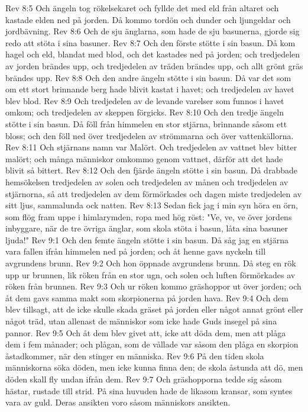 Rev 8:5  Och ängeln tog rökelsekaret och fyllde det med eld från altaret och kastade elden ned på jorden. Då kommo tordön och dunder och ljungeldar och jordbävning.
Rev 8:6  Och de sju änglarna, som hade de sju basunerna, gjorde sig redo att stöta i sina basuner.
Rev 8:7  Och den förste stötte i sin basun. Då kom hagel och eld, blandat med blod, och det kastades ned på jorden; och tredjedelen av jorden brändes upp, och tredjedelen av träden brändes upp, och allt grönt gräs brändes upp.
Rev 8:8  Och den andre ängeln stötte i sin basun. Då var det som om ett stort brinnande berg hade blivit kastat i havet; och tredjedelen av havet blev blod.
Rev 8:9  Och tredjedelen av de levande varelser som funnos i havet omkom; och tredjedelen av skeppen förgicks.
Rev 8:10  Och den tredje ängeln stötte i sin basun. Då föll från himmelen en stor stjärna, brinnande såsom ett bloss; och den föll ned över tredjedelen av strömmarna och över vattenkällorna.
Rev 8:11  Och stjärnans namn var Malört. Och tredjedelen av vattnet blev bitter malört; och många människor omkommo genom vattnet, därför att det hade blivit så bittert.
Rev 8:12  Och den fjärde ängeln stötte i sin basun. Då drabbade hemsökelsen tredjedelen av solen och tredjedelen av månen och tredjedelen av stjärnorna, så att tredjedelen av dem förmörkades och dagen miste tredjedelen av sitt ljus, sammalunda ock natten.
Rev 8:13  Sedan fick jag i min syn höra en örn, som flög fram uppe i himlarymden, ropa med hög röst: "Ve, ve, ve över jordens inbyggare, när de tre övriga änglar, som skola stöta i basun, låta sina basuner ljuda!"
Rev 9:1  Och den femte ängeln stötte i sin basun. Då såg jag en stjärna vara fallen ifrån himmelen ned på jorden; och åt henne gavs nyckeln till avgrundens brunn.
Rev 9:2  Och hon öppnade avgrundens brunn. Då steg en rök upp ur brunnen, lik röken från en stor ugn, och solen och luften förmörkades av röken från brunnen.
Rev 9:3  Och ur röken kommo gräshoppor ut över jorden; och åt dem gavs samma makt som skorpionerna på jorden hava.
Rev 9:4  Och dem blev tillsagt, att de icke skulle skada gräset på jorden eller något annat grönt eller något träd, utan allenast de människor som icke hade Guds insegel på sina pannor.
Rev 9:5  Och åt dem blev givet att, icke att döda dem, men att plåga dem i fem månader; och plågan, som de vållade var såsom den plåga en skorpion åstadkommer, när den stinger en människa.
Rev 9:6  På den tiden skola människorna söka döden, men icke kunna finna den; de skola åstunda att dö, men döden skall fly undan ifrån dem.
Rev 9:7  Och gräshopporna tedde sig såsom hästar, rustade till strid. På sina huvuden hade de likasom kransar, som syntes vara av guld. Deras ansikten voro såsom människors ansikten.
